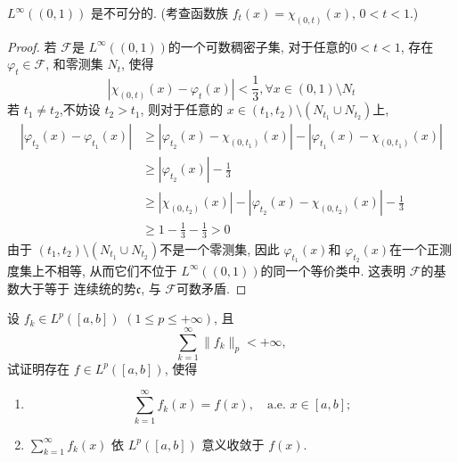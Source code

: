 \documentclass[../main.tex]{subfiles}
\begin{document}
\begin{exercise}{}{}
 $L^\infty((0,1))$ 是不可分的. (考查函数族 $f_t(x)=\chi_{(0,t)}(x)$, $0<t<1$.)
\end{exercise}

\begin{proof}
  
 若 \(  \mathcal{F}  \)是 \(  L^{\infty}\left( \left( 0,1 \right)  \right)   \)的一个可数稠密子集,  对于任意的\(  0< t< 1  \), 存在 \(   \varphi _{t}\in \mathcal{F}  \), 和零测集 \(  N_{t}  \),  使得    \[
  \left| \chi _{\left( 0,t \right) }\left( x \right)- \varphi_{t} \left( x \right)   \right| <  \frac{1}{3} ,\forall x\in \left( 0,1 \right)\setminus N_{t} 
  \] 若 \(  t_1\neq t_2  \),不妨设 \(  t_2> t_1  \), 则对于任意的 \(x\in   \left( t_1,t_2 \right)\setminus \left( N_{t_1}\cup N_{t_2} \right)    \)上,  \[
  \begin{aligned}
 \left|  \varphi _{t_2}\left( x \right) - \varphi _{t_1}\left( x \right)    \right| & \ge \left|  \varphi _{t_2}\left( x \right)-\chi _{\left( 0,t_1 \right) }\left( x \right)   \right|-\left|  \varphi _{t_1}\left( x \right)-\chi _{\left( 0,t_1 \right) }\left( x \right)   \right|  \\ 
&  \ge  \left|  \varphi _{t_2}\left( x \right)\right| - \frac{1}{3}\\ 
 &\ge \left| \chi _{\left( 0,t_2 \right) }\left( x \right)  \right|-\left|  \varphi _{t_2}\left( x \right)-\chi _{\left( 0,t_2 \right) }\left( x \right)   \right|-\frac{1}{3}\\ 
  &\ge 1- \frac{1}{3}-\frac{1}{3}> 0  
  \end{aligned}
  \]  由于 \(  \left( t_1,t_2 \right)\setminus \left( N_{t_1}\cup N_{t_2} \right)    \)不是一个零测集, 因此 \(   \varphi _{t_1}\left( x \right)   \)和 \(   \varphi _{t_2}\left( x \right)   \)在一个正测度集上不相等, 从而它们不位于 \(  L^{\infty}\left( \left( 0,1 \right)  \right)   \)的同一个等价类中. 这表明 \(  \mathcal{F}  \)的基数大于等于 连续统的势\(  \mathfrak{c}  \), 与 \(  \mathcal{F}  \)可数矛盾.      
\end{proof}
\begin{exercise}{}{}
设 $f_k\in L^p([a,b])$ $(1\le p\le +\infty)$, 且 
\[
\sum_{k=1}^{\infty}\lVert f_k\rVert_p<+\infty,
\]
试证明存在 $f\in L^p([a,b])$, 使得
\begin{enumerate}
    \item 
    \[
    \sum_{k=1}^{\infty}f_k(x)=f(x),\quad \text{a.e. }x\in[a,b];
    \]
    \item $\displaystyle\sum_{k=1}^{\infty}f_k(x)$ 依 $L^p([a,b])$ 意义收敛于 $f(x)$.
\end{enumerate}
\end{exercise}
\end{document}
